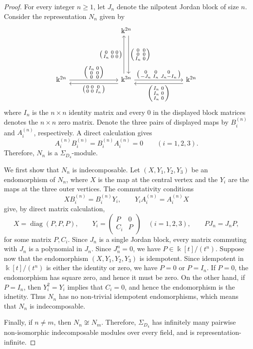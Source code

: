 \documentclass[a4paper,leqno]{amsart}
\begin{document}
\begin{proof}
For every integer $n\geq1$, let $J_n$ denote the nilpotent Jordan block of size $n$.  Consider the representation $N_n$ given by
\[
\begin{tikzcd}[column sep=large]
& & \Bbbk^{2n}
\arrow[dd, "\BTwoN", shift left=0.8ex]
& & \\[1em]
& & & & \\[1em]
\Bbbk^{2n}
\arrow[rr, "\BOneN"]
& &
\Bbbk^{3n}
\arrow[ll, "\AOneN", shift left=1.2ex]
\arrow[uu, "\ATwoN", shift left=0.8ex]
\arrow[rr, "\AThreeN"]
& &
\Bbbk^{2n}
\arrow[ll, "\BThreeN", shift left=1.2ex]
\end{tikzcd}
\]
where $I_n$ is the $n\times n$ identity matrix and every $0$ in the
displayed block matrices denotes the $n\times n$ zero matrix.  Denote
the three pairs of displayed maps by $B_i^{(n)}$ and $A_i^{(n)}$,
respectively.  A direct calculation gives
\[
A_i^{(n)}B_i^{(n)}
=
B_i^{(n)}A_i^{(n)}
=0
\qquad (i=1,2,3).
\]
Therefore, $N_n$ is a $\Sigma_{D_4}$-module.

We first show that $N_n$ is indecomposable.  Let $(X,Y_1,Y_2,Y_3)$
be an endomorphism of $N_n$, where $X$ is the map at the central
vertex and the $Y_i$ are the maps at the three outer vertices.  The
commutativity conditions
\[
XB_i^{(n)}=B_i^{(n)}Y_i,
\qquad
Y_iA_i^{(n)}=A_i^{(n)}X
\]
give, by direct matrix calculation,
\[
X=\operatorname{diag}(P,P,P),
\qquad
Y_i=
\begin{pmatrix}
P&0\\
C_i&P
\end{pmatrix}
\quad (i=1,2,3),
\qquad
PJ_n=J_nP,
\]
for some matrix $P, C_i$. 
Since $J_n$ is a single Jordan block, every matrix commuting with
$J_n$ is a polynomial in $J_n$.  Since $J_n^n=0$, we have $
P\in\Bbbk[t]/(t^n)$.
Suppose now that the endomorphism $(X,Y_1,Y_2,Y_3)$ is idempotent.  Since 
idempotent in $\Bbbk[t]/(t^n)$ is either the identity or zero, we have $P=0$ or $P=I_n$.  If $P=0$, the
endomorphism has square zero, and hence it must be zero.  On the other hand, if $P=I_n$, then $Y_i^2=Y_i$ implies that $C_i=0$, and hence the endomorphism is the idnetity.  Thus $N_n$ has no non-trivial
idempotent endomorphisms, which means that $N_n$ is indecomposable.

Finally, if $n\neq m$, then $N_n\not\cong N_m$. Therefore, $\Sigma_{D_4}$ has infinitely many pairwise non-isomorphic indecomposable modules over every field, and is representation-infinite.
\end{proof}

\end{document}
